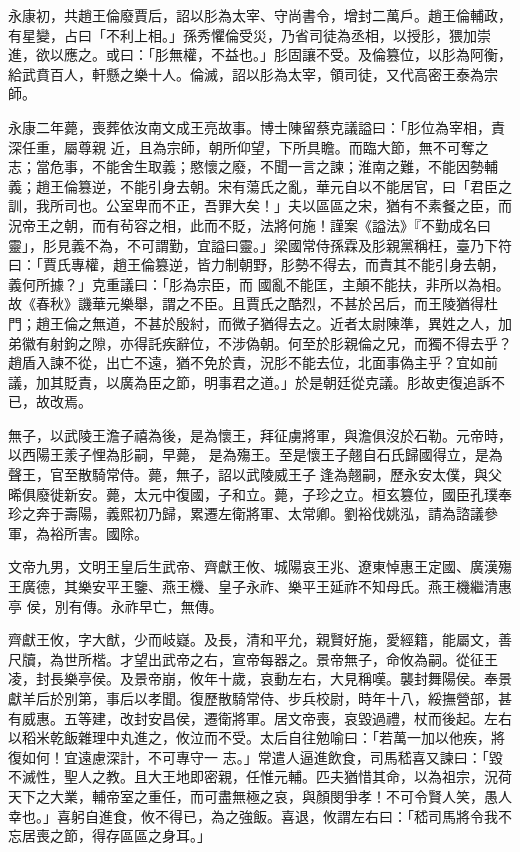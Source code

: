 \begin{pinyinscope}
 永康初，共趙王倫廢賈后，詔以肜為太宰、守尚書令，增封二萬戶。趙王倫輔政，有星變，占曰「不利上相。」孫秀懼倫受災，乃省司徒為丞相，以授肜，猥加崇進，欲以應之。或曰：「肜無權，不益也。」肜固讓不受。及倫篡位，以肜為阿衡，給武賁百人，軒懸之樂十人。倫滅，詔以肜為太宰，領司徒，又代高密王泰為宗師。



 永康二年薨，喪葬依汝南文成王亮故事。博士陳留蔡克議謚曰：「肜位為宰相，責深任重，屬尊親
 近，且為宗師，朝所仰望，下所具瞻。而臨大節，無不可奪之志；當危事，不能舍生取義；愍懷之廢，不聞一言之諫；淮南之難，不能因勢輔義；趙王倫篡逆，不能引身去朝。宋有蕩氏之亂，華元自以不能居官，曰「君臣之訓，我所司也。公室卑而不正，吾罪大矣！」夫以區區之宋，猶有不素餐之臣，而況帝王之朝，而有茍容之相，此而不貶，法將何施！謹案《謚法》『不勤成名曰靈」，肜見義不為，不可謂勤，宜謚曰靈。」梁國常侍孫霖及肜親黨稱枉，臺乃下符曰：「賈氏專權，趙王倫篡逆，皆力制朝野，肜勢不得去，而責其不能引身去朝，義何所據？」克重議曰：「肜為宗臣，而
 國亂不能匡，主顛不能扶，非所以為相。故《春秋》譏華元樂舉，謂之不臣。且賈氏之酷烈，不甚於呂后，而王陵猶得杜門；趙王倫之無道，不甚於殷紂，而微子猶得去之。近者太尉陳準，異姓之人，加弟徽有射鉤之隙，亦得託疾辭位，不涉偽朝。何至於肜親倫之兄，而獨不得去乎？趙盾入諫不從，出亡不遠，猶不免於責，況肜不能去位，北面事偽主乎？宜如前議，加其貶責，以廣為臣之節，明事君之道。」於是朝廷從克議。肜故吏復追訴不已，故改焉。



 無子，以武陵王澹子禧為後，是為懷王，拜征虜將軍，與澹俱沒於石勒。元帝時，以西陽王羕子悝為肜嗣，早薨，
 是為殤王。至是懷王子翹自石氏歸國得立，是為聲王，官至散騎常侍。薨，無子，詔以武陵威王子逢為翹嗣，歷永安太僕，與父晞俱廢徙新安。薨，太元中復國，子和立。薨，子珍之立。桓玄篡位，國臣孔璞奉珍之奔于壽陽，義熙初乃歸，累遷左衛將軍、太常卿。劉裕伐姚泓，請為諮議參軍，為裕所害。國除。



 文帝九男，文明王皇后生武帝、齊獻王攸、城陽哀王兆、遼東悼惠王定國、廣漢殤王廣德，其樂安平王鑒、燕王機、皇子永祚、樂平王延祚不知母氏。燕王機繼清惠亭
 侯，別有傳。永祚早亡，無傳。



 齊獻王攸，字大猷，少而岐嶷。及長，清和平允，親賢好施，愛經籍，能屬文，善尺牘，為世所楷。才望出武帝之右，宣帝每器之。景帝無子，命攸為嗣。從征王凌，封長樂亭侯。及景帝崩，攸年十歲，哀動左右，大見稱嘆。襲封舞陽侯。奉景獻羊后於別第，事后以孝聞。復歷散騎常侍、步兵校尉，時年十八，綏撫營部，甚有威惠。五等建，改封安昌侯，遷衛將軍。居文帝喪，哀毀過禮，杖而後起。左右以稻米乾飯雜理中丸進之，攸泣而不受。太后自往勉喻曰：「若萬一加以他疾，將復如何！宜遠慮深計，不可專守一
 志。」常遣人逼進飲食，司馬嵇喜又諫曰：「毀不滅性，聖人之教。且大王地即密親，任惟元輔。匹夫猶惜其命，以為祖宗，況荷天下之大業，輔帝室之重任，而可盡無極之哀，與顏閔爭孝！不可令賢人笑，愚人幸也。」喜躬自進食，攸不得已，為之強飯。喜退，攸謂左右曰：「嵇司馬將令我不忘居喪之節，得存區區之身耳。」




\end{pinyinscope}
